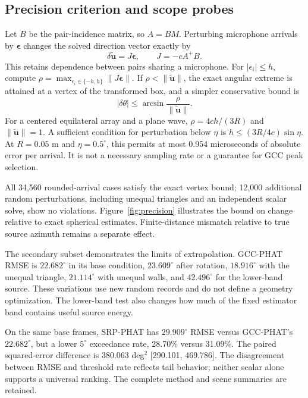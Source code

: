 \documentclass[10pt,a4paper,twocolumn]{article}
\begin{document}
\subsection{Precision criterion and scope probes}
Let $B$ be the pair-incidence matrix, so $A=BM$. Perturbing microphone arrivals by $\boldsymbol\epsilon$ changes the solved direction vector exactly by
\begin{equation}
 \delta\widetilde{\mathbf u}=J\boldsymbol\epsilon,\qquad J=-cA^+B.
\end{equation}
This retains dependence between pairs sharing a microphone. For $|\epsilon_i|\leq h$, compute $\rho=\max_{\epsilon_i\in\{-h,h\}}\|J\boldsymbol\epsilon\|$. If $\rho<\|\widetilde{\mathbf u}\|$, the exact angular extreme is attained at a vertex of the transformed box, and a simpler conservative bound is
\begin{equation}
 |\delta\theta|\leq\arcsin\frac{\rho}{\|\widetilde{\mathbf u}\|}.
 \label{eq:bound}
\end{equation}
For a centered equilateral array and a plane wave, $\rho=4ch/(3R)$ and $\|\widetilde{\mathbf u}\|=1$. A sufficient condition for perturbation below $\eta$ is $h\leq(3R/4c)\sin\eta$. At $R=0.05$ m and $\eta=0.5^\circ$, this permits at most 0.954 microseconds of absolute error per arrival. It is not a necessary sampling rate or a guarantee for GCC peak selection.

All 34,560 rounded-arrival cases satisfy the exact vertex bound; 12,000 additional random perturbations, including unequal triangles and an independent scalar solve, show no violations. Figure~\ref{fig:precision} illustrates the bound on change relative to exact spherical estimates. Finite-distance mismatch relative to true source azimuth remains a separate effect.

The secondary subset demonstrates the limits of extrapolation. GCC-PHAT RMSE is $22.682^\circ$ in its base condition, $23.609^\circ$ after rotation, $18.916^\circ$ with the unequal triangle, $21.114^\circ$ with unequal walls, and $42.496^\circ$ for the lower-band source. These variations use new random records and do not define a geometry optimization. The lower-band test also changes how much of the fixed estimator band contains useful source energy.

On the same base frames, SRP-PHAT has $29.909^\circ$ RMSE versus GCC-PHAT's $22.682^\circ$, but a lower $5^\circ$ exceedance rate, 28.70\% versus 31.09\%. The paired squared-error difference is 380.063 deg$^2$ [290.101, 469.786]. The disagreement between RMSE and threshold rate reflects tail behavior; neither scalar alone supports a universal ranking. The complete method and scene summaries are retained.
\end{document}
